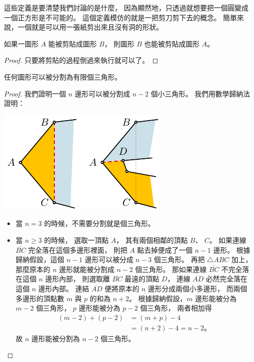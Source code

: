 \documentclass{article}
\begin{document}
\begin{multicols}{2}
\begin{remark}
	這些定義是要清楚我們討論的是什麼，
	因為顯然地，只透過就想要把一個圓變成一個正方形是不可能的。
	這個定義模仿的就是一把剪刀剪下去的概念。
	簡單來說，一個就是可以用一張紙剪出來且沒有洞的形狀。
\end{remark}


\begin{theorem}\label{thm:reversible}
	如果一圖形 $A$ 能被剪貼成圖形 $B$，
	則圖形 $B$ 也能被剪貼成圖形 $A$。
\end{theorem}
\begin{proof}
	只要將剪貼的過程倒過來執行就可以了。
\end{proof}

\begin{theorem}\label{thm:triangulate}
	任何圖形可以被分割為有限個三角形。
\end{theorem}
\begin{proof}
	我們證明一個 $n$ 邊形可以被分割成 $n-2$ 個小三角形。
	我們用數學歸納法證明：
	\begin{center}
		\includegraphics[scale=1]{figures/figure-triangulate.pdf}
	\end{center}
	\begin{itemize}
		\item[\underdot{起始}]
			當 $n=3$ 的時候，不需要分割就是個三角形。
		\item[\underdot{推遞}]
			當 $n\geq3$ 的時候，
			選取一頂點 $A$，
			其有兩個相鄰的頂點 $B$、 $C$。
			如果連線 $\overline{BC}$ 完全落在這個多邊形裡面，
			則把 $A$ 點去掉便成了一個 $n-1$ 邊形。
			根據歸納假設，這個 $n-1$ 邊形可以被分成 $n-3$ 個三角形。
			再把 $\triangle{ABC}$ 加上，那麼原本的 $n$ 邊形就能被分割成 $n-2$ 個三角形。
			那如果連線 $\overline{BC}$ 不完全落在這個 $n$ 邊形內部，
			則選取離 $\overline{BC}$ 最遠的頂點 $D$，
			連線 $\overline{AD}$ 必然完全落在這個 $n$ 邊形內部。
			連結 $\overline{AD}$ 便將原本的 $n$ 邊形分成兩個小多邊形，
			而兩個多邊形的頂點數 $m$ 與 $p$ 的和為 $n+2$。
			根據歸納假設，$m$ 邊形能被分為 $m-2$ 個三角形，
			$p$ 邊形能被分為 $p-2$ 個三角形，
			兩者相加得
			\begin{align*}
				(m-2) + (p-2)
				&= (m+p) -4 \\
				&= (n+2) -4
				= n-2。
			\end{align*}
			故 $n$ 邊形能被分割為 $n-2$ 個三角形。
			\qedhere
	\end{itemize}
\end{proof}


\end{multicols}
\end{document}
